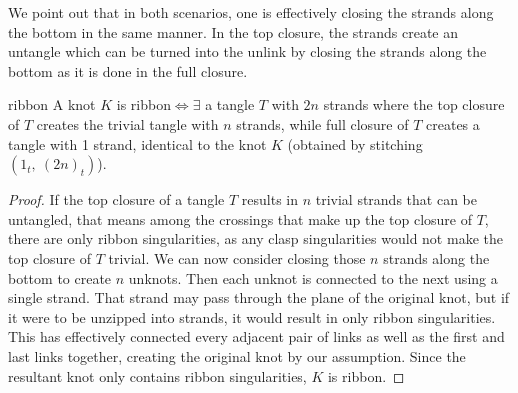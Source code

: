 \begin{paper}
We point out that in both scenarios, one is effectively closing the strands
along the bottom in the same manner.
In the top closure, the strands create an untangle which can be turned into the
unlink by closing the strands along the bottom as it is done in the
full closure.

\begin{papertheorem}{ribbon}
A knot $K$ is ribbon$\iff\exists$ a tangle $T$ with $2n$ strands where the
top closure of $T$ creates the trivial tangle with $n$ strands, while
full closure of $T$ creates a tangle with 1 strand, identical to the knot $K$
(obtained by stitching $(1_t,~(2n)_t)$).
\end{papertheorem}
\begin{proof}
If the top closure of a tangle $T$ results in $n$ trivial strands that can be
untangled, that means among the crossings that make up the top closure of $T$,
there are only ribbon singularities, as any clasp singularities would not make
the top closure of $T$ trivial.
We can now consider closing those $n$ strands along the bottom to create $n$
unknots.
Then each unknot is connected to the next using a single strand.
That strand may pass through the plane of the original knot, but if it were to
be unzipped into strands, it would result in only ribbon singularities.
This has effectively connected every adjacent pair of links as well as the first
and last links together, creating the original knot by our assumption.
Since the resultant knot only contains ribbon singularities, $K$ is ribbon.


\end{proof}
\end{paper}
